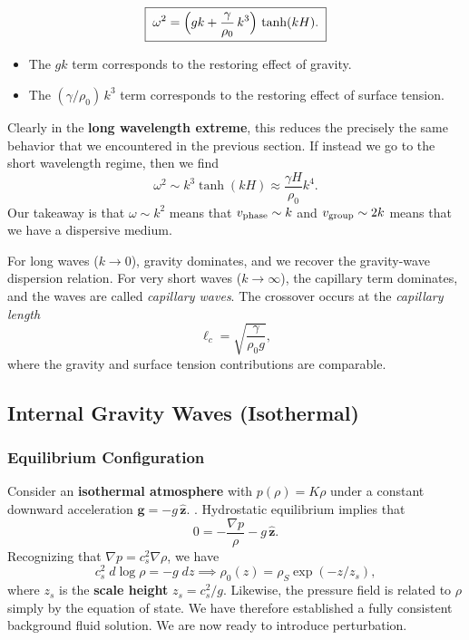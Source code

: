 \begin{equation}
\boxed{\;\omega^2 = \Bigl(gk + \frac{\gamma}{\rho_0}\,k^3\Bigr)\,\tanh(kH).\;}
\end{equation}

\begin{itemize}
    \item The $gk$ term corresponds to the restoring effect of gravity.
    \item The $(\gamma/\rho_0)\,k^3$ term corresponds to the restoring effect of surface tension.
\end{itemize}
\par
Clearly in the \textbf{long wavelength extreme}, this reduces the precisely the same behavior that we encountered in the previous section. If instead we go to the short wavelength regime, then we find
\[
\omega^2 \sim k^3 \tanh(kH) \approx \frac{\gamma H}{\rho_0} k^4.
\]
Our takeaway is that $\omega \sim k^2$ means that $v_{\rm phase} \sim k$ and $v_{\rm group} \sim 2k$ means that we have a dispersive medium.

\begin{remark}
For long waves ($k\to 0$), gravity dominates, and we recover the gravity-wave dispersion relation. 
For very short waves ($k\to\infty$), the capillary term dominates, and the waves are called \emph{capillary waves}. 
The crossover occurs at the \emph{capillary length}
\[
\ell_c = \sqrt{\frac{\gamma}{\rho_0 g}},
\]
where the gravity and surface tension contributions are comparable.
\end{remark}


\subsection{Internal Gravity Waves (Isothermal)}

\subsubsection*{Equilibrium Configuration}

Consider an \textbf{isothermal atmosphere} with $p(\rho) = K\rho$ under a constant downward acceleration $\mathbf{g} = - g \, \hat{\mathbf{z}}$. . Hydrostatic equilibrium implies that
\[
0 = -\frac{\nabla p}{\rho} - g \, \hat{\mathbf{z}}.
\]
Recognizing that $\nabla p = c_s^2 \nabla \rho$, we have 
\[
c_s^2\; d\log \rho = - g \;dz \implies \rho_0(z) = \rho_{S} \exp(-z/z_s),
\]
where $z_s$ is the \textbf{scale height} $z_s = c_s^2/g$. Likewise, the pressure field is related to $\rho$ simply by the equation of state. We have therefore established a fully consistent background fluid solution. We are now ready to introduce perturbation.
